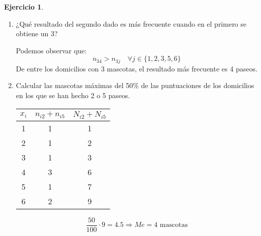 \documentclass[a4paper, 12pt]{article}
\theoremstyle{definition}
\newtheorem{ej}{Ejercicio}
\begin{document}
\begin{ej}
\begin{enumerate}[label=\alph*)]
	\item ¿Qué resultado del segundo dado es más frecuente cuando en el primero se obtiene un 3?
	
	Podemos observar que:
\[
	n_{34} > n_{3j} \quad \forall j \in \{1,2,3,5,6\}
\]
De entre los domicilios con 3 mascotas, el resultado más frecuente es 4 paseos.

	\item Calcular las mascotas máximas del 50\% de las puntuaciones de los domicilios en los que se han hecho 2 o 5 paseos.
	
\begin{center}
\begin{tabular}{|c|c|c|}
	\hline
	\(x_i\) & \(n_{i2} + n_{i5}\) & \(N_{i2} + N_{i5}\) \\
	\hline
	1 & 1 & 1 \\
	2 & 1 & 2 \\
	3 & 1 & 3 \\
	4 & 3 & 6 \\
	5 & 1 & 7 \\
	6 & 2 & 9 \\
	\hline
\end{tabular}
\end{center}

\[
	\frac{50}{100} \cdot 9 = 4.5 \Rightarrow Me = 4 \text{ mascotas}
\]
\end{enumerate}
\end{ej}
\end{document}
